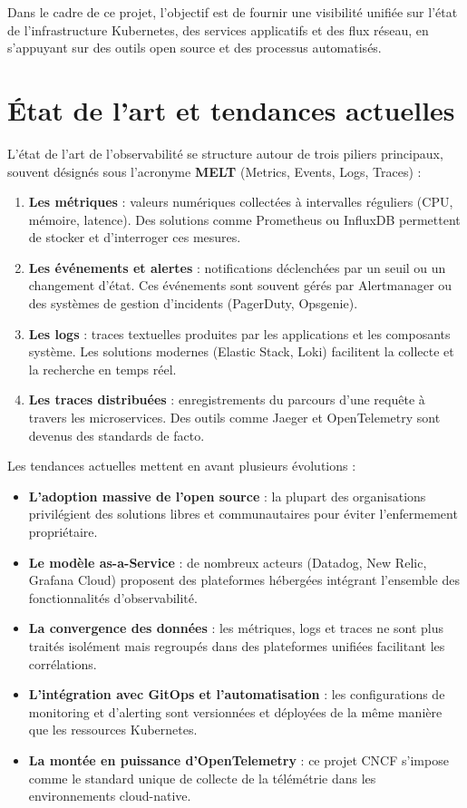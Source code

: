 Dans le cadre de ce projet, l’objectif est de fournir une visibilité unifiée sur l’état de l’infrastructure Kubernetes, des services applicatifs et des flux réseau, en s’appuyant sur des outils open source et des processus automatisés.

\section{État de l'art et tendances actuelles}

L’état de l’art de l’observabilité se structure autour de trois piliers principaux, souvent désignés sous l’acronyme \textbf{MELT} (Metrics, Events, Logs, Traces) :

\begin{enumerate}
	\item \textbf{Les métriques} : valeurs numériques collectées à intervalles réguliers (CPU, mémoire, latence). Des solutions comme Prometheus ou InfluxDB permettent de stocker et d’interroger ces mesures.
	\item \textbf{Les événements et alertes} : notifications déclenchées par un seuil ou un changement d’état. Ces événements sont souvent gérés par Alertmanager ou des systèmes de gestion d’incidents (PagerDuty, Opsgenie).
	\item \textbf{Les logs} : traces textuelles produites par les applications et les composants système. Les solutions modernes (Elastic Stack, Loki) facilitent la collecte et la recherche en temps réel.
	\item \textbf{Les traces distribuées} : enregistrements du parcours d’une requête à travers les microservices. Des outils comme Jaeger et OpenTelemetry sont devenus des standards de facto.
\end{enumerate}

Les tendances actuelles mettent en avant plusieurs évolutions :

\begin{itemize}
	\item \textbf{L’adoption massive de l’open source} : la plupart des organisations privilégient des solutions libres et communautaires pour éviter l’enfermement propriétaire.
	\item \textbf{Le modèle as-a-Service} : de nombreux acteurs (Datadog, New Relic, Grafana Cloud) proposent des plateformes hébergées intégrant l’ensemble des fonctionnalités d’observabilité.
	\item \textbf{La convergence des données} : les métriques, logs et traces ne sont plus traités isolément mais regroupés dans des plateformes unifiées facilitant les corrélations.
	\item \textbf{L’intégration avec GitOps et l’automatisation} : les configurations de monitoring et d’alerting sont versionnées et déployées de la même manière que les ressources Kubernetes.
	\item \textbf{La montée en puissance d’OpenTelemetry} : ce projet CNCF s’impose comme le standard unique de collecte de la télémétrie dans les environnements cloud-native.
\end{itemize}

